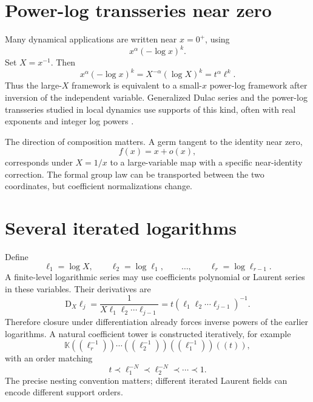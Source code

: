 \documentclass[11pt,oneside,openany]{book}
\newcommand{\K}{\mathbb{K}}
\newcommand{\D}{\mathrm{D}}
\begin{document}
\section{Power-log transseries near zero}
Many dynamical applications are written near \(x=0^+\), using
\begin{equation}\label{eq:powerlogzero}
 x^\alpha(-\log x)^k.
\end{equation}
Set \(X=x^{-1}\).  Then
\[
 x^\alpha(-\log x)^k=X^{-\alpha}(\log X)^k=t^\alpha\ell^k.
\]
Thus the large-\(X\) framework is equivalent to a small-\(x\) power-log
framework after inversion of the independent variable.  Generalized Dulac
series and the power-log transseries studied in local dynamics use supports of
this kind, often with real exponents and integer log powers
\cite{MardesicEtAl2016}.

The direction of composition matters.  A germ tangent to the identity near
zero,
\[
 f(x)=x+o(x),
\]
corresponds under \(X=1/x\) to a large-variable map with a specific
near-identity correction.  The formal group law can be transported between the
two coordinates, but coefficient normalizations change.

\section{Several iterated logarithms}
Define
\begin{equation}\label{eq:iteratedlogs}
 \ell_1=\log X,
 \qquad
 \ell_2=\log\ell_1,
 \qquad
 \ldots,
 \qquad
 \ell_r=\log\ell_{r-1}.
\end{equation}
A finite-level logarithmic series may use coefficients polynomial or Laurent
series in these variables.  Their derivatives are
\begin{equation}\label{eq:iteratedlogderivatives}
 \D_X\ell_j
 =\frac{1}{X\ell_1\ell_2\cdots\ell_{j-1}}
 =t(\ell_1\ell_2\cdots\ell_{j-1})^{-1}.
\end{equation}
Therefore closure under differentiation already forces inverse powers of the
earlier logarithms.  A natural coefficient tower is constructed iteratively,
for example
\begin{equation}\label{eq:logtowerfield}
 \K((\ell_r^{-1}))\cdots((\ell_2^{-1}))((\ell_1^{-1}))((t)),
\end{equation}
with an order matching
\[
 t\prec\ell_1^{-N}\prec\ell_2^{-N}\prec\cdots\prec1.
\]
The precise nesting convention matters; different iterated Laurent fields can
encode different support orders.
\end{document}
